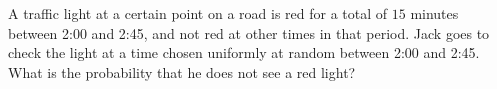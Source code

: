 A traffic light at a certain point on a road is red for a total of $15$ minutes between 2:00 and 2:45, and not red at other times in that period. Jack goes to check the light at a time chosen uniformly at random between 2:00 and 2:45. What is the probability that he does not see a red light?
